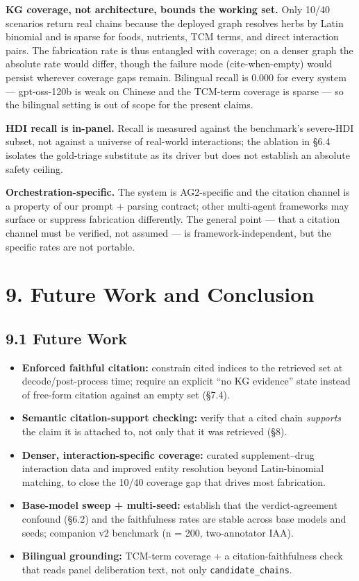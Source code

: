 \documentclass[
]{article}
\providecommand{\tightlist}{%
  \setlength{\itemsep}{0pt}\setlength{\parskip}{0pt}}
\begin{document}
\textbf{KG coverage, not architecture, bounds the working set.} Only
10/40 scenarios return real chains because the deployed graph resolves
herbs by Latin binomial and is sparse for foods, nutrients, TCM terms,
and direct interaction pairs. The fabrication rate is thus entangled
with coverage; on a denser graph the absolute rate would differ, though
the failure mode (cite-when-empty) would persist wherever coverage gaps
remain. Bilingual recall is 0.000 for every system --- gpt-oss-120b is
weak on Chinese and the TCM-term coverage is sparse --- so the bilingual
setting is out of scope for the present claims.

\textbf{HDI recall is in-panel.} Recall is measured against the
benchmark's severe-HDI subset, not against a universe of real-world
interactions; the ablation in §6.4 isolates the gold-triage substitute
as its driver but does not establish an absolute safety ceiling.

\textbf{Orchestration-specific.} The system is AG2-specific and the
citation channel is a property of our prompt + parsing contract; other
multi-agent frameworks may surface or suppress fabrication differently.
The general point --- that a citation channel must be verified, not
assumed --- is framework-independent, but the specific rates are not
portable.

\hypertarget{future-work-and-conclusion}{%
\section{9. Future Work and
Conclusion}\label{future-work-and-conclusion}}

\hypertarget{future-work}{%
\subsection{9.1 Future Work}\label{future-work}}

\begin{itemize}
\tightlist
\item
  \textbf{Enforced faithful citation:} constrain cited indices to the
  retrieved set at decode/post-process time; require an explicit ``no KG
  evidence'' state instead of free-form citation against an empty set
  (§7.4).
\item
  \textbf{Semantic citation-support checking:} verify that a cited chain
  \emph{supports} the claim it is attached to, not only that it was
  retrieved (§8).
\item
  \textbf{Denser, interaction-specific coverage:} curated
  supplement--drug interaction data and improved entity resolution
  beyond Latin-binomial matching, to close the 10/40 coverage gap that
  drives most fabrication.
\item
  \textbf{Base-model sweep + multi-seed:} establish that the
  verdict-agreement confound (§6.2) and the faithfulness rates are
  stable across base models and seeds; companion v2 benchmark (n = 200,
  two-annotator IAA).
\item
  \textbf{Bilingual grounding:} TCM-term coverage + a
  citation-faithfulness check that reads panel deliberation text, not
  only \texttt{candidate\_chains}.
\end{itemize}
\end{document}
